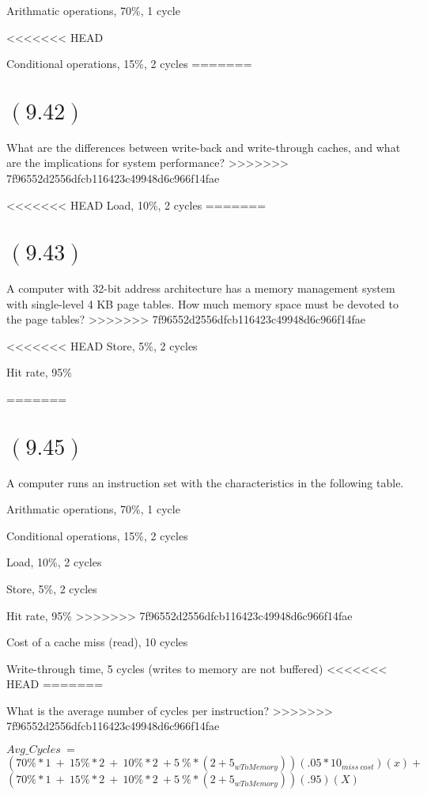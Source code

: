 \documentclass[letterpaper,12pt,titlepage]{article}
\begin{document}
Arithmatic operations, 70\%, 1 cycle

<<<<<<< HEAD
 
Conditional operations, 15\%, 2 cycles
=======
\section*{$(9.42)$} What are the differences between write-back and write-through caches, and what are the implications for system performance?
>>>>>>> 7f96552d2556dfcb116423c49948d6c966f14fae


<<<<<<< HEAD
Load, 10\%, 2 cycles
=======
\section*{$(9.43)$} A computer with 32-bit address architecture has a memory management system with single-level 4 KB page tables. How much memory space must be devoted to the page tables?
>>>>>>> 7f96552d2556dfcb116423c49948d6c966f14fae


<<<<<<< HEAD
Store, 5\%, 2 cycles


Hit rate, 95\%

=======
\section*{$(9.45)$} A computer runs an instruction set with the characteristics in the following table.

Arithmatic operations, 70\%, 1 cycle

Conditional operations, 15\%, 2 cycles

Load, 10\%, 2 cycles

Store, 5\%, 2 cycles

Hit rate, 95\%
>>>>>>> 7f96552d2556dfcb116423c49948d6c966f14fae

Cost of a cache miss (read), 10 cycles

Write-through time, 5 cycles (writes to memory are not buffered)
<<<<<<< HEAD
=======

What is the average number of cycles per instruction?
>>>>>>> 7f96552d2556dfcb116423c49948d6c966f14fae

\begin{mdframed}[style=MyFrame]
$Avg\_Cycles~=~$\\
$(70\%*1~+~15\%*2~+~10\%*2~+5~\%*(2+5_{wToMemory}))(.05*10_{miss~cost})(x)+$\\
              $(70\%*1~+~15\%*2~+~10\%*2~+5~\%*(2+5_{wToMemory}))(.95)(X)$

\end{mdframed}
\end{document}
